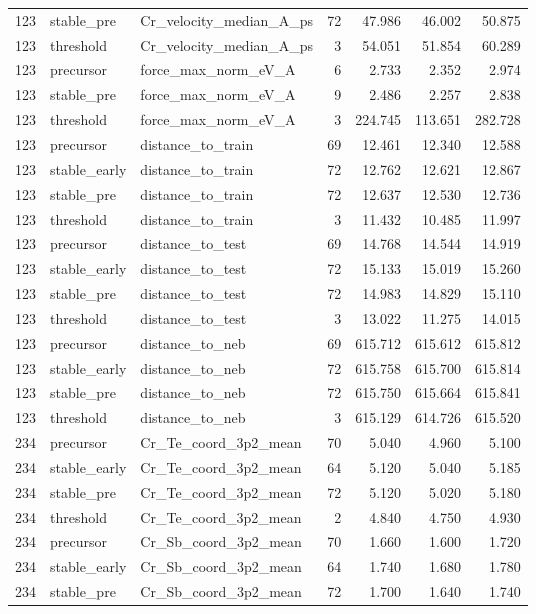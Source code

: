 \begin{tabular}{lllrrrr}
123 & stable_pre & Cr_velocity_median_A_ps & 72 & 47.986 & 46.002 & 50.875 \\
123 & threshold & Cr_velocity_median_A_ps & 3 & 54.051 & 51.854 & 60.289 \\
123 & precursor & force_max_norm_eV_A & 6 & 2.733 & 2.352 & 2.974 \\
123 & stable_pre & force_max_norm_eV_A & 9 & 2.486 & 2.257 & 2.838 \\
123 & threshold & force_max_norm_eV_A & 3 & 224.745 & 113.651 & 282.728 \\
123 & precursor & distance_to_train & 69 & 12.461 & 12.340 & 12.588 \\
123 & stable_early & distance_to_train & 72 & 12.762 & 12.621 & 12.867 \\
123 & stable_pre & distance_to_train & 72 & 12.637 & 12.530 & 12.736 \\
123 & threshold & distance_to_train & 3 & 11.432 & 10.485 & 11.997 \\
123 & precursor & distance_to_test & 69 & 14.768 & 14.544 & 14.919 \\
123 & stable_early & distance_to_test & 72 & 15.133 & 15.019 & 15.260 \\
123 & stable_pre & distance_to_test & 72 & 14.983 & 14.829 & 15.110 \\
123 & threshold & distance_to_test & 3 & 13.022 & 11.275 & 14.015 \\
123 & precursor & distance_to_neb & 69 & 615.712 & 615.612 & 615.812 \\
123 & stable_early & distance_to_neb & 72 & 615.758 & 615.700 & 615.814 \\
123 & stable_pre & distance_to_neb & 72 & 615.750 & 615.664 & 615.841 \\
123 & threshold & distance_to_neb & 3 & 615.129 & 614.726 & 615.520 \\
234 & precursor & Cr_Te_coord_3p2_mean & 70 & 5.040 & 4.960 & 5.100 \\
234 & stable_early & Cr_Te_coord_3p2_mean & 64 & 5.120 & 5.040 & 5.185 \\
234 & stable_pre & Cr_Te_coord_3p2_mean & 72 & 5.120 & 5.020 & 5.180 \\
234 & threshold & Cr_Te_coord_3p2_mean & 2 & 4.840 & 4.750 & 4.930 \\
234 & precursor & Cr_Sb_coord_3p2_mean & 70 & 1.660 & 1.600 & 1.720 \\
234 & stable_early & Cr_Sb_coord_3p2_mean & 64 & 1.740 & 1.680 & 1.780 \\
234 & stable_pre & Cr_Sb_coord_3p2_mean & 72 & 1.700 & 1.640 & 1.740 \\

\end{tabular}
